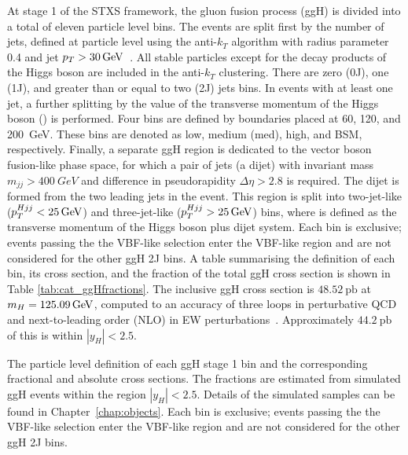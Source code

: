 At stage 1 of the STXS framework, 
the gluon fusion process (ggH) is divided into a total of eleven particle level bins.
The events are split first by the number of jets, 
defined at particle level using the anti-$k_T$ algorithm with radius parameter 0.4 
and jet $p_T > \SI{30}{GeV}$~\cite{AntiKt}.
All stable particles except for the decay products of the Higgs boson 
are included in the anti-$k_T$ clustering.
There are zero (0J), one (1J), and greater than or equal to two (2J) jets bins.
In events with at least one jet, a further splitting 
by the value of the transverse momentum of the Higgs boson (\ptH) is performed. 
Four bins are defined by boundaries placed at 60, 120, and \SI{200}{GeV}.
These bins are denoted as low, medium (med), high, and BSM, respectively.
Finally, a separate ggH region is dedicated to the vector boson fusion-like phase space, 
for which a pair of jets (a dijet) with invariant mass $m_{jj} > \SI{400}{GeV}$ 
and difference in pseudorapidity $\Delta\eta > 2.8$ is required.
The dijet is formed from the two leading jets in the event.
This region is split into two-jet-like ($p_T^{Hjj} < \SI{25}{GeV}$) 
and three-jet-like ($p_T^{Hjj} > \SI{25}{GeV}$) bins, 
where \ptHjj is defined as the transverse momentum of the Higgs boson plus dijet system.
Each bin is exclusive; events passing the the VBF-like selection enter the VBF-like region
and are not considered for the other ggH 2J bins.
A table summarising the definition of each bin, its cross section, and the fraction of the 
total ggH cross section is shown in Table \ref{tab:cat_ggHfractions}.
The inclusive ggH cross section is $48.52~\textrm{pb}$ at $m_{H} = \SI{125.09}{GeV}$, 
computed to an accuracy of three loops in perturbative QCD 
and next-to-leading order (NLO) in EW perturbations~\cite{YR4,Anastasiou2015,Anastasiou2016}.
Approximately $44.2~\textrm{pb}$ of this is within $|y_H| < 2.5$.

\begin{table}
  \begin{centering}
    
    \caption[Particle level definitions of the ggH stage 1 STXS bins.]
    {
      The particle level definition of each ggH stage 1 bin 
      and the corresponding fractional and absolute cross sections.
      The fractions are estimated from simulated ggH \Hgg events 
      within the region $|y_H| < 2.5$.
      Details of the simulated samples can be found in Chapter~\ref{chap:objects}.
      Each bin is exclusive; events passing the the VBF-like selection enter the VBF-like region
      and are not considered for the other ggH 2J bins.
    }
    \label{tab:cat_ggHfractions}
  \end{centering}
\end{table}

